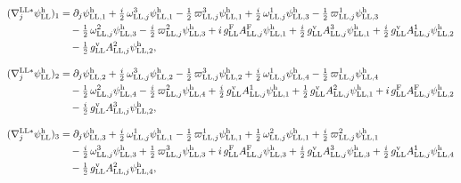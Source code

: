 \documentclass[
  10pt,
]{article}
\begin{document}
\[\begin{aligned}
(\nabla^{{\rm LL}*}_j\psi^{\rm h}_{\rm LL})_1&=\partial_j\psi^{\rm h}_{{\rm LL},1}+\tfrac{i}{2}\,\omega^{3}_{{\rm LL},j}\psi^{\rm h}_{{\rm LL},1}-\tfrac{1}{2}\,\varpi^{3}_{{\rm LL},j}\psi^{\rm h}_{{\rm LL},1}+\tfrac{i}{2}\,\omega^{1}_{{\rm LL},j}\psi^{\rm h}_{{\rm LL},3}-\tfrac{1}{2}\,\varpi^{1}_{{\rm LL},j}\psi^{\rm h}_{{\rm LL},3}\\
&\quad -\tfrac{1}{2}\,\omega^{2}_{{\rm LL},j}\psi^{\rm h}_{{\rm LL},3}-\tfrac{i}{2}\,\varpi^{2}_{{\rm LL},j}\psi^{\rm h}_{{\rm LL},3}+i\,g^{\rm F}_{\rm LL}A^{\rm F}_{{\rm LL},j}\psi^{\rm h}_{{\rm LL},1}+\tfrac{i}{2}\,g^{\rm v}_{\rm LL}A^{3}_{{\rm LL},j}\psi^{\rm h}_{{\rm LL},1}+\tfrac{i}{2}\,g^{\rm v}_{\rm LL}A^{1}_{{\rm LL},j}\psi^{\rm h}_{{\rm LL},2}\\
&\quad -\tfrac{1}{2}\,g^{\rm v}_{\rm LL}A^{2}_{{\rm LL},j}\psi^{\rm h}_{{\rm LL},2},
\end{aligned}\]

\[\begin{aligned}
(\nabla^{{\rm LL}*}_j\psi^{\rm h}_{\rm LL})_2&=\partial_j\psi^{\rm h}_{{\rm LL},2}+\tfrac{i}{2}\,\omega^{3}_{{\rm LL},j}\psi^{\rm h}_{{\rm LL},2}-\tfrac{1}{2}\,\varpi^{3}_{{\rm LL},j}\psi^{\rm h}_{{\rm LL},2}+\tfrac{i}{2}\,\omega^{1}_{{\rm LL},j}\psi^{\rm h}_{{\rm LL},4}-\tfrac{1}{2}\,\varpi^{1}_{{\rm LL},j}\psi^{\rm h}_{{\rm LL},4}\\
&\quad -\tfrac{1}{2}\,\omega^{2}_{{\rm LL},j}\psi^{\rm h}_{{\rm LL},4}-\tfrac{i}{2}\,\varpi^{2}_{{\rm LL},j}\psi^{\rm h}_{{\rm LL},4}+\tfrac{i}{2}\,g^{\rm v}_{\rm LL}A^{1}_{{\rm LL},j}\psi^{\rm h}_{{\rm LL},1}+\tfrac{1}{2}\,g^{\rm v}_{\rm LL}A^{2}_{{\rm LL},j}\psi^{\rm h}_{{\rm LL},1}+i\,g^{\rm F}_{\rm LL}A^{\rm F}_{{\rm LL},j}\psi^{\rm h}_{{\rm LL},2}\\
&\quad -\tfrac{i}{2}\,g^{\rm v}_{\rm LL}A^{3}_{{\rm LL},j}\psi^{\rm h}_{{\rm LL},2},
\end{aligned}\]

\[\begin{aligned}
(\nabla^{{\rm LL}*}_j\psi^{\rm h}_{\rm LL})_3&=\partial_j\psi^{\rm h}_{{\rm LL},3}+\tfrac{i}{2}\,\omega^{1}_{{\rm LL},j}\psi^{\rm h}_{{\rm LL},1}-\tfrac{1}{2}\,\varpi^{1}_{{\rm LL},j}\psi^{\rm h}_{{\rm LL},1}+\tfrac{1}{2}\,\omega^{2}_{{\rm LL},j}\psi^{\rm h}_{{\rm LL},1}+\tfrac{i}{2}\,\varpi^{2}_{{\rm LL},j}\psi^{\rm h}_{{\rm LL},1}\\
&\quad -\tfrac{i}{2}\,\omega^{3}_{{\rm LL},j}\psi^{\rm h}_{{\rm LL},3}+\tfrac{1}{2}\,\varpi^{3}_{{\rm LL},j}\psi^{\rm h}_{{\rm LL},3}+i\,g^{\rm F}_{\rm LL}A^{\rm F}_{{\rm LL},j}\psi^{\rm h}_{{\rm LL},3}+\tfrac{i}{2}\,g^{\rm v}_{\rm LL}A^{3}_{{\rm LL},j}\psi^{\rm h}_{{\rm LL},3}+\tfrac{i}{2}\,g^{\rm v}_{\rm LL}A^{1}_{{\rm LL},j}\psi^{\rm h}_{{\rm LL},4}\\
&\quad -\tfrac{1}{2}\,g^{\rm v}_{\rm LL}A^{2}_{{\rm LL},j}\psi^{\rm h}_{{\rm LL},4},
\end{aligned}\]
\end{document}
